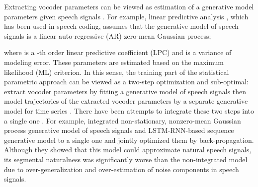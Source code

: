 \documentclass{article}
\begin{document}
Extracting vocoder parameters can be viewed as estimation of a generative model parameters given speech signals \citep{LPC,UELS}.
For example, linear predictive analysis \citep{LPC}, which has been used in speech coding, assumes that the generative model of speech signals is 
a linear auto-regressive (AR) zero-mean Gaussian process;

where  is a -th order linear predictive coefficient (LPC) and  
is a variance of modeling error.
These parameters are estimated based on the maximum likelihood (ML) criterion.
In this sense, the training part of the statistical parametric approach can be viewed as a two-step optimization and sub-optimal: extract vocoder parameters by fitting a generative model of speech signals then model trajectories of the extracted vocoder parameters by a separate generative model for time series \citep{Tokuda_ASRU2011}.
There have been attempts to integrate these two steps into a single one
\citep{STAVOCO,MGELSD,Maia_WaveformModel_SSW,Kazuhiro_McepHMM_IEICE,Black_AutoEncoder_arXiv,Tokuda_CepLSTM_ICASSP2015,Tokuda_MixCepLSTM_ICASSP2016,Takaki_FFTDNN_ICASSP}.
For example, \cite{Tokuda_MixCepLSTM_ICASSP2016} integrated non-stationary, nonzero-mean Gaussian process generative model of speech signals and LSTM-RNN-based sequence generative model to a single one and jointly optimized them by back-propagation.
Although they showed that this model could approximate natural speech signals, its segmental naturalness was significantly worse than the non-integrated model due to over-generalization and over-estimation of noise components in speech signals.
\end{document}
